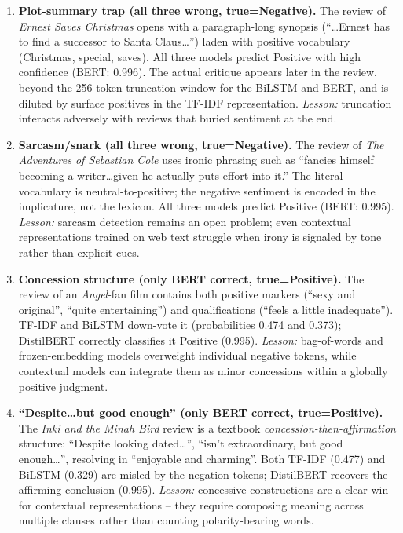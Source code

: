 \documentclass[11pt,a4paper]{article}
\begin{document}
\begin{enumerate}[leftmargin=*]
    \item \textbf{Plot-summary trap (all three wrong, true=Negative).} The review of \emph{Ernest Saves Christmas} opens with a paragraph-long synopsis (``\ldots Ernest has to find a successor to Santa Claus\ldots'') laden with positive vocabulary (Christmas, special, saves). All three models predict Positive with high confidence (BERT: 0.996). The actual critique appears later in the review, beyond the 256-token truncation window for the BiLSTM and BERT, and is diluted by surface positives in the TF-IDF representation. \emph{Lesson:} truncation interacts adversely with reviews that buried sentiment at the end.

    \item \textbf{Sarcasm/snark (all three wrong, true=Negative).} The review of \emph{The Adventures of Sebastian Cole} uses ironic phrasing such as ``fancies himself becoming a writer\ldots given he actually puts effort into it.'' The literal vocabulary is neutral-to-positive; the negative sentiment is encoded in the implicature, not the lexicon. All three models predict Positive (BERT: 0.995). \emph{Lesson:} sarcasm detection remains an open problem; even contextual representations trained on web text struggle when irony is signaled by tone rather than explicit cues.

    \item \textbf{Concession structure (only BERT correct, true=Positive).} The review of an \emph{Angel}-fan film contains both positive markers (``sexy and original'', ``quite entertaining'') and qualifications (``feels a little inadequate''). TF-IDF and BiLSTM down-vote it (probabilities 0.474 and 0.373); DistilBERT correctly classifies it Positive (0.995). \emph{Lesson:} bag-of-words and frozen-embedding models overweight individual negative tokens, while contextual models can integrate them as minor concessions within a globally positive judgment.

    \item \textbf{``Despite\ldots but good enough'' (only BERT correct, true=Positive).} The \emph{Inki and the Minah Bird} review is a textbook \emph{concession-then-affirmation} structure: ``Despite looking dated\ldots'', ``isn't extraordinary, but good enough\ldots'', resolving in ``enjoyable and charming''. Both TF-IDF (0.477) and BiLSTM (0.329) are misled by the negation tokens; DistilBERT recovers the affirming conclusion (0.995). \emph{Lesson:} concessive constructions are a clear win for contextual representations -- they require composing meaning across multiple clauses rather than counting polarity-bearing words.


\end{enumerate}
\end{document}
